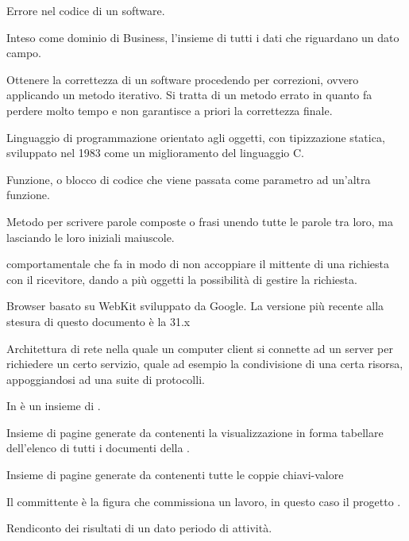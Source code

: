 Errore nel codice di un software.

Inteso come dominio di Business, l'insieme di tutti i dati che riguardano un dato campo.

Ottenere la correttezza di un software procedendo per correzioni, ovvero applicando un metodo iterativo. Si tratta di un metodo errato in quanto fa perdere molto tempo e non garantisce a priori la correttezza finale.


Linguaggio di programmazione orientato agli oggetti, con tipizzazione statica, sviluppato nel 1983 come un miglioramento del linguaggio C.

Funzione, o blocco di codice che viene passata come parametro ad un'altra funzione.

Metodo per scrivere parole composte o frasi unendo tutte le parole tra loro, ma lasciando le loro iniziali maiuscole.

 comportamentale che fa in modo di non accoppiare il mittente di una richiesta con il ricevitore, dando a più oggetti la possibilità di gestire la richiesta.

Browser basato su WebKit sviluppato da Google. La versione più recente alla stesura di questo documento è la 31.x

Architettura di rete nella quale un computer client si connette ad un server per richiedere un certo servizio, quale ad esempio la condivisione di una certa risorsa, appoggiandosi ad una suite di protocolli.

In  è un insieme di .

Insieme di pagine generate da \ProjectName{} contenenti la visualizzazione in forma tabellare dell'elenco di tutti i documenti della  .

Insieme di pagine generate da \ProjectName{} contenenti tutte le coppie chiavi-valore

Il committente è la figura che commissiona un lavoro, in questo caso il progetto \ProjectName{}.

Rendiconto  dei risultati di un dato periodo di attività.

